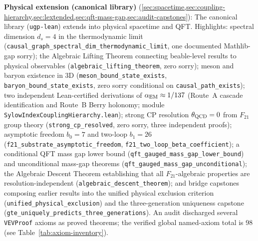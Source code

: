\documentclass[11pt,a4paper]{article}
\theoremstyle{definition}
\begin{document}
\medskip
\noindent\textbf{Physical extension (canonical library)}
(\cref{sec:spacetime,sec:coupling-hierarchy,sec:lextended,sec:qft-mass-gap,sec:audit-capstones}):
The canonical library (\texttt{ugp-lean}) extends into
physical spacetime and QFT.  Highlights:
spectral dimension $d_s = 4$ in the thermodynamic limit
(\lstinline|causal_graph_spectral_dim_thermodynamic_limit|, one documented Mathlib-gap sorry);
the Algebraic Lifting Theorem connecting beable-level results to physical
observables (\lstinline|algebraic_lifting_theorem|, zero sorry);
meson and baryon existence in 3D
(\lstinline|meson_bound_state_exists|, \lstinline|baryon_bound_state_exists|,
zero sorry conditional on \lstinline|causal_path_exists|);
two independent Lean-certified derivations of $\alpha_{\rm EM} \approx 1/137$
(Route~A cascade identification and Route~B Berry holonomy;
module \texttt{SylowIndexCouplingHierarchy.lean});
strong CP resolution $\theta_{\rm QCD} = 0$ from $F_{21}$ group theory
(\lstinline|strong_cp_resolved|, zero sorry, three independent proofs);
asymptotic freedom $b_0 = 7$ and two-loop $b_1 = 26$
(\lstinline|f21_substrate_asymptotic_freedom|, \lstinline|f21_two_loop_beta_coefficient|);
a conditional QFT mass gap lower bound
(\lstinline|qft_gauged_mass_gap_lower_bound|) and unconditional mass-gap
theorems (\lstinline|qft_gauged_mass_gap_unconditional|);
the Algebraic Descent Theorem establishing that all $F_{21}$-algebraic
properties are resolution-independent
(\lstinline|algebraic_descent_theorem|);
and bridge capstones composing earlier results into the unified physical
exclusion criterion (\lstinline|unified_physical_exclusion|) and the
three-generation uniqueness capstone
(\lstinline|gte_uniquely_predicts_three_generations|).
An audit discharged several \texttt{VEVProof} axioms as proved theorems;
the verified global named-axiom total is 98 (see Table~\ref{tab:axiom-inventory}).
\end{document}
